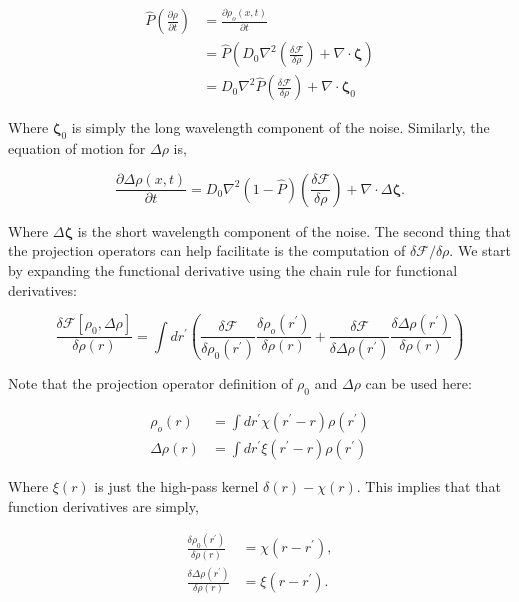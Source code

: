 \documentclass[11pt]{article}
\begin{document}
\begin{align}
\hat{P}\left(\frac{\partial \rho}{\partial t}\right) &= \frac{\partial \rho_o(x,t)}{\partial t} \nonumber\\
 &= \hat{P} \left(D_0 \nabla^2 \left( \frac{\delta \mathcal{F}}{\delta \rho}\right) + \nabla\cdot\boldsymbol{\zeta}\right) \nonumber\\ 
 &= D_0 \nabla^2 \hat{P} \left(\frac{\delta \mathcal{F}}{\delta \rho} \right) + \nabla \cdot \boldsymbol{\zeta}_0
\end{align}

Where $\boldsymbol{\zeta}_0$ is simply the long wavelength component of the noise. Similarly, the equation of motion for $\Delta \rho$ is, 

\begin{equation}
\frac{\partial \Delta \rho(x,t)}{\partial t} = D_0 \nabla^2 \left(1-\hat{P}\right)\left(\frac{\delta \mathcal{F}}{\delta \rho}\right) + \nabla \cdot \Delta \boldsymbol \zeta.
\end{equation}

Where $\Delta \boldsymbol \zeta$ is the short wavelength component of the noise. The second thing that the projection operators can help facilitate is the computation of $\delta \mathcal{F}/\delta \rho$. We start by expanding the functional derivative using the chain rule for functional derivatives:

\begin{equation}
\frac{\delta \mathcal{F}[\rho_0, \Delta \rho]}{\delta \rho(r)} = \int dr^\prime \left(\frac{\delta \mathcal{F}}{\delta \rho_0(r^\prime)}\frac{\delta \rho_o(r^\prime)}{\delta \rho(r)} + \frac{\delta \mathcal{F}}{\delta \Delta\rho(r^\prime)}\frac{\delta \Delta \rho(r^\prime)}{\delta \rho(r)}\right)
\end{equation}

Note that the projection operator definition of $\rho_0$ and $\Delta \rho$ can be used here: 

\begin{align}
\rho_o(r) &= \int dr^\prime \chi (r^\prime - r) \rho(r^\prime) \\
\Delta \rho(r) &= \int dr^\prime \xi(r^\prime - r) \rho(r^\prime) 
\end{align}

Where $\xi(r)$ is just the high-pass kernel $\delta (r) - \chi(r)$. This implies that that function derivatives are simply, 

\begin{align}
\frac{\delta \rho_0(r^\prime)}{\delta\rho(r)} &= \chi(r-r^\prime), \\
\frac{\delta \Delta \rho(r^\prime)}{\delta \rho(r)} &= \xi(r-r^\prime).
\end{align}
\end{document}
